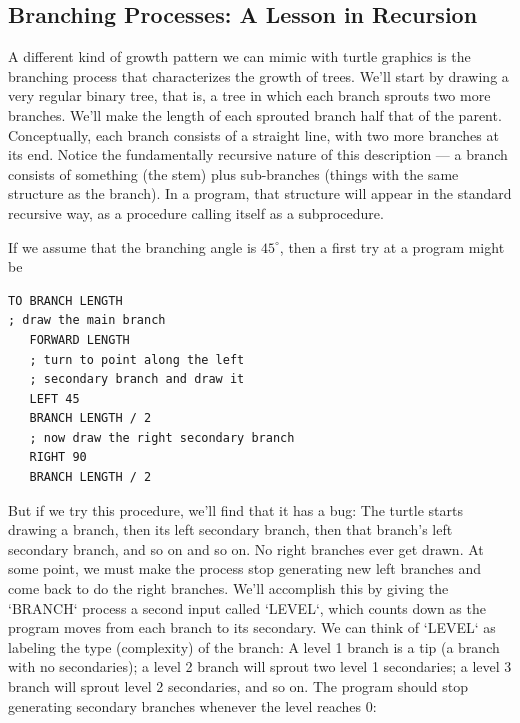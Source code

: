 \documentclass{book}
\begin{document}
\subsection{Branching Processes: A Lesson in Recursion}

A different kind of growth pattern we can mimic with turtle graphics
is the branching process that characterizes the growth of trees. We'll
start by drawing a very regular binary tree, that is, a tree in which
each branch sprouts two more branches. We'll make the length of each
sprouted branch half that of the parent. Conceptually, each branch
consists of a straight line, with two more branches at its end. Notice the
fundamentally recursive nature of this description --- a branch consists of
something (the stem) plus sub-branches (things with the same structure
as the branch). In a program, that structure will appear in the standard
recursive way, as a procedure calling itself as a subprocedure.

If we assume that the branching angle is $45^{\circ}$, then a first try at a
program might be

\begin{verbatim}
TO BRANCH LENGTH
; draw the main branch
   FORWARD LENGTH
   ; turn to point along the left
   ; secondary branch and draw it
   LEFT 45
   BRANCH LENGTH / 2
   ; now draw the right secondary branch
   RIGHT 90
   BRANCH LENGTH / 2
\end{verbatim}
But if we try this procedure, we'll find that it has a bug: The turtle starts
drawing a branch, then its left secondary branch, then that branch's
left secondary branch, and so on and so on. No right branches ever get
drawn. At some point, we must make the process stop generating new
left branches and come back to do the right branches. We'll accomplish
this by giving the \textsc{`BRANCH`} process a second input called \textsc{`LEVEL`}, which
counts down as the program moves from each branch to its secondary.
We can think of \textsc{`LEVEL`} as labeling the type (complexity) of the branch:
A level 1 branch is a tip (a branch with no secondaries); a level 2 branch
will sprout two level 1 secondaries; a level 3 branch will sprout level 2
secondaries, and so on. The program should stop generating secondary
branches whenever the level reaches 0:
\end{document}
